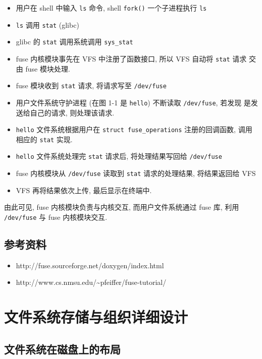 \documentclass[nofonts]{ctexart}
\begin{document}
\begin{itemize}
\item
  用户在 shell 中输入 \texttt{ls} 命令, shell \texttt{fork()}
  一个子进程执行 \texttt{ls}
\item
  \texttt{ls} 调用 \texttt{stat} (glibc)
\item
  glibc 的 \texttt{stat} 调用系统调用 \texttt{sys\_stat}
\item
  fuse 内核模块事先在 VFS 中注册了函数接口, 所以 VFS 自动将
  \texttt{stat} 请求 交由 fuse 模块处理.
\item
  fuse 模块收到 \texttt{stat} 请求, 将请求写至 \texttt{/dev/fuse}
\item
  用户文件系统守护进程 (在图 1-1 是 \texttt{hello}) 不断读取
  \texttt{/dev/fuse}, 若发现 是发送给自己的请求, 则处理该请求.
\item
  \texttt{hello} 文件系统根据用户在 \texttt{struct fuse\_operations}
  注册的回调函数, 调用 相应的 \texttt{stat} 实现.
\item
  \texttt{hello} 文件系统处理完 \texttt{stat} 请求后, 将处理结果写回给
  \texttt{/dev/fuse}
\item
  fuse 内核模块从 \texttt{/dev/fuse} 读取到 \texttt{stat}
  请求的处理结果, 将结果返回给 VFS
\item
  VFS 再将结果依次上传, 最后显示在终端中.
\end{itemize}

由此可见, fuse 内核模块负责与内核交互, 而用户文件系统通过 fuse 库, 利用
\texttt{/dev/fuse} 与 fuse 内核模块交互.

\subsection{参考资料}\label{ux53c2ux8003ux8d44ux6599}

\begin{itemize}
\item
  http://fuse.sourceforge.net/doxygen/index.html
\item
  http://www.cs.nmsu.edu/\textasciitilde{}pfeiffer/fuse-tutorial/
\end{itemize}

\section{文件系统存储与组织详细设计}\label{ux6587ux4ef6ux7cfbux7edfux5b58ux50a8ux4e0eux7ec4ux7ec7ux8be6ux7ec6ux8bbeux8ba1}

\subsection{文件系统在磁盘上的布局}\label{ux6587ux4ef6ux7cfbux7edfux5728ux78c1ux76d8ux4e0aux7684ux5e03ux5c40}
\end{document}
